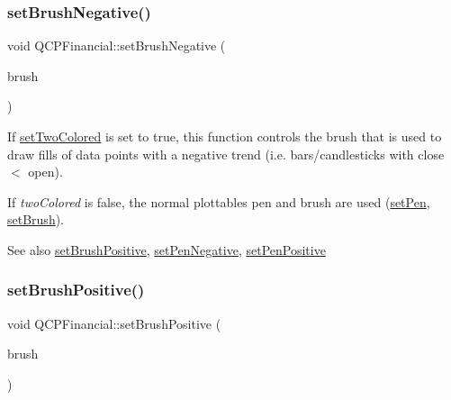 \mbox{\label{class_q_c_p_financial_a8bbdd87629f9144b3ef51af660c0961a}} 
\subsubsection{\texorpdfstring{set\+Brush\+Negative()}{setBrushNegative()}}
{\footnotesize\ttfamily void Q\+C\+P\+Financial\+::set\+Brush\+Negative (\begin{DoxyParamCaption}\item[{const Q\+Brush \&}]{brush }\end{DoxyParamCaption})}

If \hyperlink{class_q_c_p_financial_a138e44aac160a17a9676652e240c5f08}{set\+Two\+Colored} is set to true, this function controls the brush that is used to draw fills of data points with a negative trend (i.\+e. bars/candlesticks with close $<$ open).

If {\itshape two\+Colored} is false, the normal plottable\textquotesingle{}s pen and brush are used (\hyperlink{class_q_c_p_abstract_plottable_ab74b09ae4c0e7e13142fe4b5bf46cac7}{set\+Pen}, \hyperlink{class_q_c_p_abstract_plottable_a7a4b92144dca6453a1f0f210e27edc74}{set\+Brush}).

\begin{DoxySeeAlso}{See also}
\hyperlink{class_q_c_p_financial_a5ebff2b1764efd07cc44942e67821829}{set\+Brush\+Positive}, \hyperlink{class_q_c_p_financial_afe5c07e94ccea01a75b3a2476993c346}{set\+Pen\+Negative}, \hyperlink{class_q_c_p_financial_ac58aa3adc7a35aab0088764b840683e5}{set\+Pen\+Positive} 
\end{DoxySeeAlso}
\mbox{\label{class_q_c_p_financial_a5ebff2b1764efd07cc44942e67821829}} 
\subsubsection{\texorpdfstring{set\+Brush\+Positive()}{setBrushPositive()}}
{\footnotesize\ttfamily void Q\+C\+P\+Financial\+::set\+Brush\+Positive (\begin{DoxyParamCaption}\item[{const Q\+Brush \&}]{brush }\end{DoxyParamCaption})}

